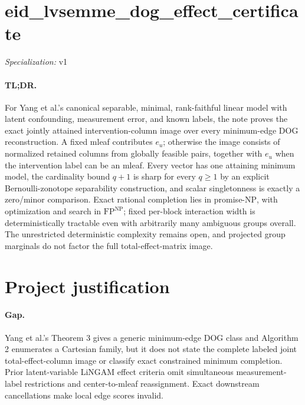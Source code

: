 \documentclass{article}
\begin{document}
\sloppy

\section*{eid\_\allowbreak{}lvsemme\_\allowbreak{}dog\_\allowbreak{}effect\_\allowbreak{}certificate}

\noindent\textit{Specialization:} v1\par

\paragraph{TL;DR.} For Yang et al.'s canonical separable, minimal, rank-faithful linear model with latent confounding, measurement error, and known labels, the note proves the exact jointly attained intervention-column image over every minimum-edge DOG reconstruction. A fixed mleaf contributes \(e_u\); otherwise the image consists of normalized retained columns from globally feasible pairs, together with \(e_u\) when the intervention label can be an mleaf. Every vector has one attaining minimum model, the cardinality bound \(q+1\) is sharp for every \(q\ge1\) by an explicit Bernoulli-zonotope separability construction, and scalar singletonness is exactly a zero/minor comparison. Exact rational completion lies in promise-\(\mathrm{NP}\), with optimization and search in \(\mathrm{FP}^{\mathrm{NP}}\); fixed per-block interaction width is deterministically tractable even with arbitrarily many ambiguous groups overall. The unrestricted deterministic complexity remains open, and projected group marginals do not factor the full total-effect-matrix image.

\section{Project justification}

\paragraph{Gap.} Yang et al.'s Theorem 3 gives a generic minimum-edge DOG class and Algorithm 2 enumerates a Cartesian family, but it does not state the complete labeled joint total-effect-column image or classify exact constrained minimum completion. Prior latent-variable LiNGAM effect criteria omit simultaneous measurement-label restrictions and center-to-mleaf reassignment. Exact downstream cancellations make local edge scores invalid.
\end{document}
